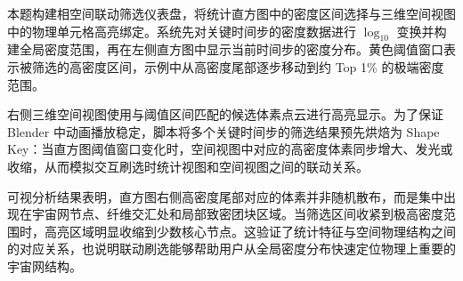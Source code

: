 \documentclass[12pt, a4paper]{article}
\begin{document}
\noindent 本题构建相空间联动筛选仪表盘，将统计直方图中的密度区间选择与三维空间视图中的物理单元格高亮绑定。系统先对关键时间步的密度数据进行 $\log_{10}$ 变换并构建全局密度范围，再在左侧直方图中显示当前时间步的密度分布。黄色阈值窗口表示被筛选的高密度区间，示例中从高密度尾部逐步移动到约 Top 1\% 的极端密度范围。

\noindent 右侧三维空间视图使用与阈值区间匹配的候选体素点云进行高亮显示。为了保证 Blender 中动画播放稳定，脚本将多个关键时间步的筛选结果预先烘焙为 Shape Key：当直方图阈值窗口变化时，空间视图中对应的高密度体素同步增大、发光或收缩，从而模拟交互刷选时统计视图和空间视图之间的联动关系。

\noindent 可视分析结果表明，直方图右侧高密度尾部对应的体素并非随机散布，而是集中出现在宇宙网节点、纤维交汇处和局部致密团块区域。当筛选区间收紧到极高密度范围时，高亮区域明显收缩到少数核心节点。这验证了统计特征与空间物理结构之间的对应关系，也说明联动刷选能够帮助用户从全局密度分布快速定位物理上重要的宇宙网结构。
\end{document}
